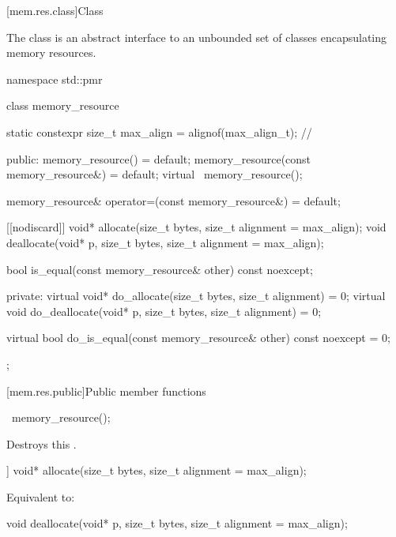 [mem.res.class]{Class }

\pnum
The  class is an abstract interface to an unbounded set of classes encapsulating memory resources.

%
%
\begin{codeblock}
namespace std::pmr {
  class memory_resource {
    static constexpr size_t max_align = alignof(max_align_t);   // \expos

  public:
    memory_resource() = default;
    memory_resource(const memory_resource&) = default;
    virtual ~memory_resource();

    memory_resource& operator=(const memory_resource&) = default;

    [[nodiscard]] void* allocate(size_t bytes, size_t alignment = max_align);
    void deallocate(void* p, size_t bytes, size_t alignment = max_align);

    bool is_equal(const memory_resource& other) const noexcept;

  private:
    virtual void* do_allocate(size_t bytes, size_t alignment) = 0;
    virtual void do_deallocate(void* p, size_t bytes, size_t alignment) = 0;

    virtual bool do_is_equal(const memory_resource& other) const noexcept = 0;
  };
}
\end{codeblock}


[mem.res.public]{Public member functions}

%
\begin{itemdecl}
~memory_resource();
\end{itemdecl}

\begin{itemdescr}
\pnum
\effects
Destroys this .
\end{itemdescr}

%
\begin{itemdecl}
[[nodiscard]] void* allocate(size_t bytes, size_t alignment = max_align);
\end{itemdecl}

\begin{itemdescr}
\pnum
\effects
Equivalent to: 
\end{itemdescr}

%
\begin{itemdecl}
void deallocate(void* p, size_t bytes, size_t alignment = max_align);
\end{itemdecl}

